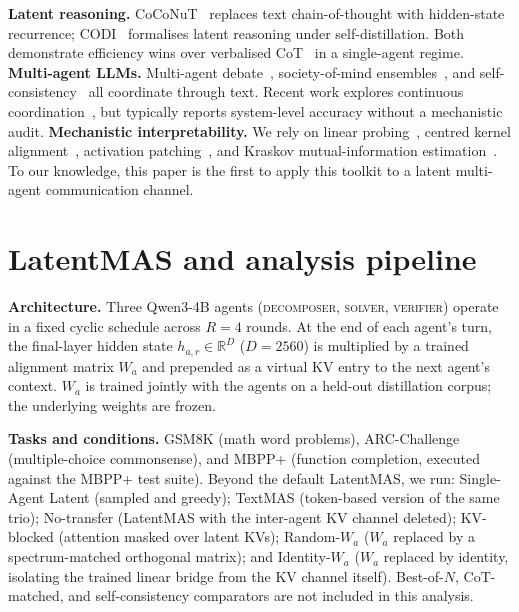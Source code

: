 \documentclass{article}
\begin{document}
\textbf{Latent reasoning.} CoCoNuT~\citep{hao2024training} replaces text chain-of-thought with hidden-state recurrence; CODI~\citep{shen2024codi} formalises latent reasoning under self-distillation. Both demonstrate efficiency wins over verbalised CoT~\citep{wei2022chain} in a single-agent regime. \textbf{Multi-agent LLMs.} Multi-agent debate~\citep{du2023improving}, society-of-mind ensembles~\citep{liang2023encouraging,wang2023unleashing}, and self-consistency~\citep{wang2023selfconsistency} all coordinate through text. Recent work explores continuous coordination~\citep{xu2024can,liu2024latent}, but typically reports system-level accuracy without a mechanistic audit. \textbf{Mechanistic interpretability.} We rely on linear probing~\citep{alain2017understanding}, centred kernel alignment~\citep{kornblith2019similarity}, activation patching~\citep{meng2022locating,zhang2024towards}, and Kraskov mutual-information estimation~\citep{kraskov2004estimating}. To our knowledge, this paper is the first to apply this toolkit to a latent multi-agent communication channel.

\section{LatentMAS and analysis pipeline}
\label{sec:method}

\textbf{Architecture.} Three Qwen3-4B agents (\textsc{decomposer}, \textsc{solver}, \textsc{verifier}) operate in a fixed cyclic schedule across $R{=}4$ rounds. At the end of each agent's turn, the final-layer hidden state $h_{a,r} \in \mathbb{R}^{D}$ ($D{=}2560$) is multiplied by a trained alignment matrix $W_a$ and prepended as a virtual KV entry to the next agent's context. $W_a$ is trained jointly with the agents on a held-out distillation corpus; the underlying weights are frozen.

\textbf{Tasks and conditions.} GSM8K (math word problems), ARC-Challenge (multiple-choice commonsense), and MBPP+ (function completion, executed against the MBPP+ test suite). Beyond the default LatentMAS, we run: Single-Agent Latent (sampled and greedy); TextMAS (token-based version of the same trio); No-transfer (LatentMAS with the inter-agent KV channel deleted); KV-blocked (attention masked over latent KVs); Random-$W_a$ ($W_a$ replaced by a spectrum-matched orthogonal matrix); and Identity-$W_a$ ($W_a$ replaced by identity, isolating the trained linear bridge from the KV channel itself). Best-of-$N$, CoT-matched, and self-consistency comparators are not included in this analysis.
\end{document}
